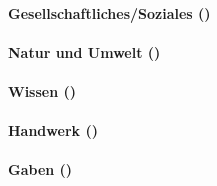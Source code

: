 \paragraph{Gesellschaftliches/Soziales (\SP[16])}

\paragraph{Natur und Umwelt (\SP[16])}

\paragraph{Wissen (\SP[28])}

\paragraph{Handwerk (\SP[28])}

\paragraph{Gaben ()}
